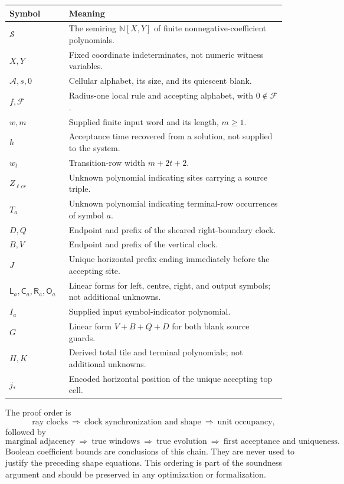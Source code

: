 \documentclass[11pt,letterpaper]{article}
\numberwithin{equation}{section}
\theoremstyle{definition}
\newcommand{\N}{\mathbb N}
\newcommand{\A}{\mathcal A}
\newcommand{\F}{\mathcal F}
\newcommand{\Sring}{\mathcal S}
\newcommand{\LL}{\mathsf L}
\newcommand{\CC}{\mathsf C}
\newcommand{\RR}{\mathsf R}
\newcommand{\OO}{\mathsf O}
\begin{document}
\begin{longtable}{@{}p{0.20\linewidth}p{0.73\linewidth}@{}}
\toprule
Symbol & Meaning\\
\midrule
\endhead
$\Sring$ & The semiring $\N[X,Y]$ of finite nonnegative-coefficient polynomials.\\
$X,Y$ & Fixed coordinate indeterminates, not numeric witness variables.\\
$\A,s,0$ & Cellular alphabet, its size, and its quiescent blank.\\
$f,\F$ & Radius-one local rule and accepting alphabet, with $0\notin\F$.\\
$w,m$ & Supplied finite input word and its length, $m\ge1$.\\
$h$ & Acceptance time recovered from a solution, not supplied to the system.\\
$w_t$ & Transition-row width $m+2t+2$.\\
$Z_{\ell c r}$ & Unknown polynomial indicating sites carrying a source triple.\\
$T_a$ & Unknown polynomial indicating terminal-row occurrences of symbol $a$.\\
$D,Q$ & Endpoint and prefix of the sheared right-boundary clock.\\
$B,V$ & Endpoint and prefix of the vertical clock.\\
$J$ & Unique horizontal prefix ending immediately before the accepting site.\\
$\LL_a,\CC_a,\RR_a,\OO_a$ & Linear forms for left, centre, right, and output symbols; not additional unknowns.\\
$I_a$ & Supplied input symbol-indicator polynomial.\\
$G$ & Linear form $V+B+Q+D$ for both blank source guards.\\
$H,K$ & Derived total tile and terminal polynomials; not additional unknowns.\\
$j_*$ & Encoded horizontal position of the unique accepting top cell.\\
\bottomrule
\end{longtable}

The proof order is
\[
 \text{ray clocks}
 \ \Longrightarrow\ \text{clock synchronization and shape}
 \ \Longrightarrow\ \text{unit occupancy},
\]
followed by
\[
 \text{marginal adjacency}
 \ \Longrightarrow\ \text{true windows}
 \ \Longrightarrow\ \text{true evolution}
 \ \Longrightarrow\ \text{first acceptance and uniqueness}.
\]
Boolean coefficient bounds are conclusions of this chain. They are never
used to justify the preceding shape equations. This ordering is part of
the soundness argument and should be preserved in any optimization or
formalization.
\end{document}
